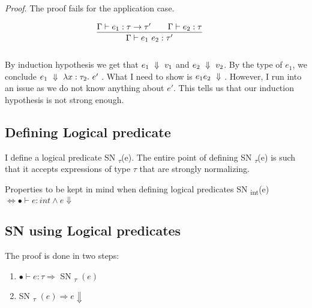 \documentclass[10pt]{article}
\begin{document}
\textit{Proof}. The proof fails for the application case.

  
   \[
  \begin{array}{cc}
  
  
  \infr
  {\envent{e_1}{\funct{\tau}{\tau'}} \iand 
  	\envent{e_2}{\tau}}
  {\envent{e_1~e_2}{\tau'}} 
 
  &
  
  \\\\
  \end{array}
  \]
  By induction hypothesis we get that ${e_1 ~\Downarrow~ v_1}$ and ${e_2 ~\Downarrow~ v_2}$. By the type of $e_1$, we
  conclude ${e_1 ~\Downarrow~ \lambda x : \tau_2.~e'}$
  . What I need to show is $e_1 e_2 ~\Downarrow~$.
  \vskip 0.1in
  However, I  run into an issue as we do not know anything about $e'$. This tells us that our induction hypothesis is not strong enough. 
  
  \subsection{Defining Logical predicate}
  
 I define a logical predicate SN \textsubscript{$\tau$}(e). The entire point of defining  SN \textsubscript{$\tau$}(e) is such that it accepts expressions of type $\tau$ that are strongly normalizing. 
 
 \vskip 0.2in
 
 Properties to be kept in mind when defining logical predicates
  \vskip 0.2in
 SN \textsubscript{int}(e) $\Longleftrightarrow  \bullet \vdash e: int \wedge e \Downarrow $ 
\subsection{SN using Logical predicates}
  
  The proof is done in two steps:
  \vskip 0.2in
  \begin{enumerate}
  	\item  $ \bullet \vdash e: \tau \Longrightarrow$ SN  \textsubscript{$\tau$} $(e)$
  	\item  SN  \textsubscript{$\tau$} $(e) \Longrightarrow e \Downarrow$
  \end{enumerate}
\end{document}
